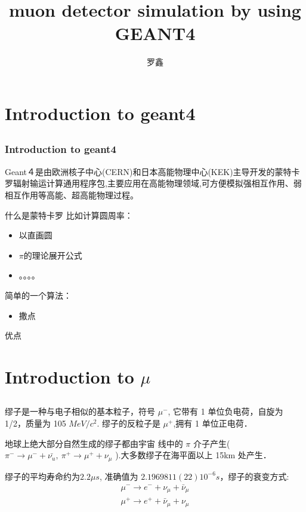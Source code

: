 \documentclass[notheorems, aspectratio=54]{beamer}
\title[muon detector simulation by using GEANT4]{muon detector simulation by using GEANT4}
\author{罗鑫}
\institute[SYSU]{luox46@mail2.sysu.edu.cn}
\begin{document}
\begin{frame}
    \titlepage
\end{frame}

\section{Introduction to geant4}
\subsection{}
\begin{frame}
  \frametitle{Introduction to geant4}
  Geant４是由欧洲核子中心(CERN)和日本高能物理中心(KEK)主导开发的蒙特卡罗辐射输运计算通用程序包,主要应用在高能物理领域,可方便模拟强相互作用、弱相互作用等高能、超高能物理过程。
\begin{block}{什么是蒙特卡罗}
  比如计算圆周率：
  \begin{itemize}
    \item 以直画圆
    \item $\pi$的理论展开公式
    \item 。。。。
  \end{itemize}
  简单的一个算法：
  \begin{itemize}
    \item 撒点
  \end{itemize}
\end{block}

\begin{block}{}
优点
\end{block}
\end{frame}
\section{Introduction to $\mu$}
\subsection{}

\begin{frame}
缪子是一种与电子相似的基本粒子，符号 $\mu^-$, 它带有 1 单位负电荷，自旋为 1/2，质量为 105 $MeV/c^2$. 缪子的反粒子是 $\mu^+$,拥有 1 单位正电荷．

地球上绝大部分自然生成的缪子都由宇宙
线中的 $\pi$ 介子产生($\pi^- \rightarrow \mu^- + \bar{\nu_u},\ \pi^+\rightarrow \mu^+ + \nu_\mu$ ).大多数缪子在海平面以上 15km 处产生．

缪子的平均寿命约为$2.2\mu s$, 准确值为 $2.1969811(22) 10^{−6} s$，缪子的衰变方式:
\begin{align}
\mu^- \rightarrow e^- + \nu_\mu + \bar\nu_\mu \\
\mu^+ \rightarrow e^+ + \bar\nu_\mu + \nu_\mu
\end{align}

\end{frame}
\end{document}
